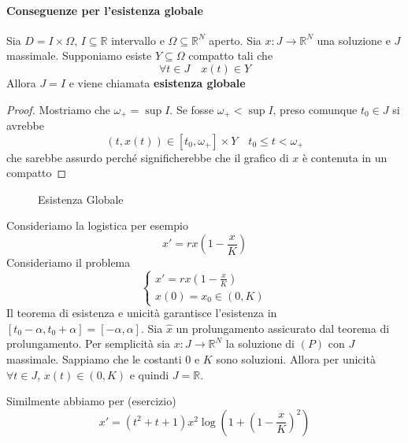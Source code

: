 \paragraph{Conseguenze per l'esistenza globale}
\begin{proposition}

    Sia \(D = I \times \Omega\), \(I \subseteq \mathbb{R} \) intervallo e
        \(\Omega \subseteq \mathbb{R}^{N} \) aperto. 
        Sia \(x : J \to \mathbb{R}^{N}\) una soluzione e \(J\) massimale.
        Supponiamo esiste \(Y \subseteq \Omega \) compatto tali che
        \[
            \forall  t \in J \quad x(t) \in Y
        \]
        Allora \(J = I\) e viene chiamata \textbf{esistenza globale}
\end{proposition}
\begin{proof}
    Mostriamo che \(\omega_+ = \sup I\). Se fosse \(\omega_+ < \sup I\), preso
    comunque \(t_{0} \in J\) si avrebbe
    \[
        (t, x(t)) \in  [t_{0}, \omega_+] \times Y \quad t_{0} \le  t < \omega_+
    \]
    che sarebbe assurdo perché significherebbe che il grafico di \(x\) è contenuta in un
    compatto
\end{proof}
\begin{figure}[ht]
    \centering
    \caption{Esistenza Globale}\label{fig:esistenza_globale}
\end{figure}

\begin{example}
Consideriamo la logistica per esempio
\[
    x' = rx(1-\frac{x}{K})
\]
Consideriamo il problema
\[
    \begin{cases}
        x' = rx(1-\frac{x}{K}) \\
        x(0) = x_{0} \in (0, K)
    \end{cases}
\]
Il teorema di esistenza e unicità garantisce l'esistenza in \([t_{0} - \alpha,
t_{0}+ \alpha] = [-\alpha, \alpha]\). Sia \(\hat{x}\) un prolungamento
assicurato dal teorema di prolungamento. Per semplicità sia \(x : J \to
\mathbb{R}^{N}\) la soluzione di \((P)\) con \(J\) massimale. Sappiamo che le
costanti \(0\) e \(K\) sono soluzioni. Allora per unicità \(\forall t \in  J\),
\(x(t) \in (0, K)\) e quindi \(J = \mathbb{R}\).
\end{example}

\begin{example}
    Similmente abbiamo per (esercizio)
    \[
        x' = (t^2 + t + 1) x^2 \log ( 1 + {(1-\frac{x}{K})}^2 )
    \]
\end{example}

